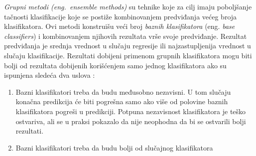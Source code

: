 \documentclass[12pt,oneside]{memoir}
\begin{document}
\textit{Grupni metodi (eng.~ensemble methods)} su tehnike koje za cilj imaju poboljšanje tačnosti klasifikacije koje se postiže kombinovanjem predviđanja većeg broja klasifikatora. Ovi metodi konstruišu veći broj \textit{baznih klasifikatora} (eng.\textit{ base classifiers}) i kombinovanjem njihovih rezultata vrše svoje predviđanje. Rezultat predviđanja je srednja vrednost u slučaju regresije ili najzastupljenija vrednost u slučaju klasifikacije. Rezultati dobijeni primenom grupnih klasifikatora mogu biti bolji od rezultata dobijenih korišćenjem samo jednog klasifikatora ako su ispunjena sledeća dva uslova \cite{mitic}:
\begin{enumerate}[1)]
\item Bazni klasifikatori treba da budu međusobno nezavisni. U tom slučaju konačna predikcija će biti pogrešna samo ako više od polovine baznih klasifikatora pogreši u predikciji. Potpuna nezavisnost klasifikatora je teško ostvariva, ali se u praksi pokazalo da nije neophodna da bi se ostvarili bolji rezultati. 
\item Bazni klasifikatori treba da budu bolji od slučajnog klasifikatora
\end{enumerate}
\end{document}
